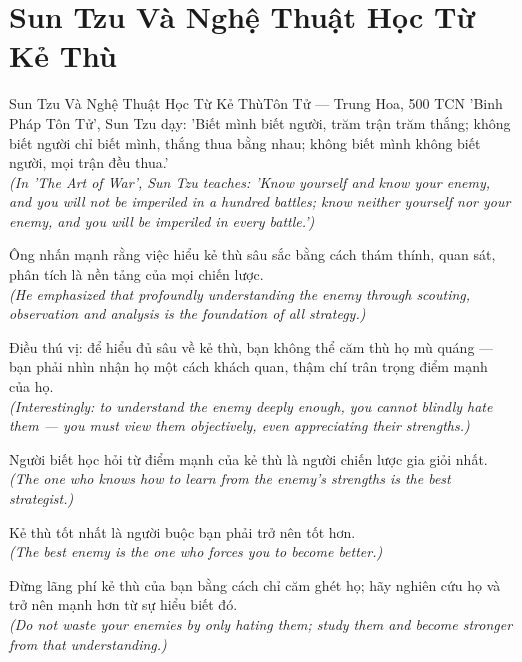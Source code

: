 \section{Sun Tzu Và Nghệ Thuật Học Từ Kẻ Thù}
\begin{truyen}{Sun Tzu Và Nghệ Thuật Học Từ Kẻ Thù}{Tôn Tử --- Trung Hoa, 500 TCN}
 'Binh Pháp Tôn Tử', Sun Tzu dạy: 'Biết mình biết người, trăm trận trăm thắng; không biết người chỉ biết mình, thắng thua bằng nhau; không biết mình không biết người, mọi trận đều thua.'\\[4pt]
\textit{(In 'The Art of War', Sun Tzu teaches: 'Know yourself and know your enemy, and you will not be imperiled in a hundred battles; know neither yourself nor your enemy, and you will be imperiled in every battle.')}

Ông nhấn mạnh rằng việc hiểu kẻ thù sâu sắc bằng cách thám thính, quan sát, phân tích là nền tảng của mọi chiến lược.\\[4pt]
\textit{(He emphasized that profoundly understanding the enemy through scouting, observation and analysis is the foundation of all strategy.)}

Điều thú vị: để hiểu đủ sâu về kẻ thù, bạn không thể căm thù họ mù quáng --- bạn phải nhìn nhận họ một cách khách quan, thậm chí trân trọng điểm mạnh của họ.\\[4pt]
\textit{(Interestingly: to understand the enemy deeply enough, you cannot blindly hate them --- you must view them objectively, even appreciating their strengths.)}

Người biết học hỏi từ điểm mạnh của kẻ thù là người chiến lược gia giỏi nhất.\\[4pt]
\textit{(The one who knows how to learn from the enemy's strengths is the best strategist.)}

Kẻ thù tốt nhất là người buộc bạn phải trở nên tốt hơn.\\[4pt]
\textit{(The best enemy is the one who forces you to become better.)}

\end{truyen}
\begin{baihoc}
  Đừng lãng phí kẻ thù của bạn bằng cách chỉ căm ghét họ; hãy nghiên cứu họ và trở nên mạnh hơn từ sự hiểu biết đó.\\[4pt]
  \textit{(Do not waste your enemies by only hating them; study them and become stronger from that understanding.)}
\end{baihoc}

